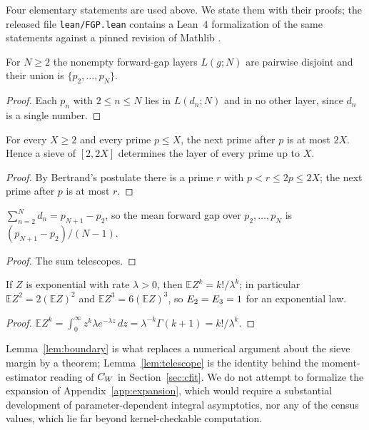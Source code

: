 \documentclass[11pt,a4paper]{article}
\begin{document}
Four elementary statements are used above. We state them with their proofs; the released file \texttt{lean/FGP.lean} contains a Lean~4 formalization of the same statements against a pinned revision of Mathlib \cite{Lean4,mathlib2020}.

\begin{lemma}[Partition]\label{lem:partition}
For $N\ge2$ the nonempty forward-gap layers $L(g;N)$ are pairwise disjoint and their union is $\{p_2,\dots,p_N\}$.
\end{lemma}
\begin{proof}
Each $p_n$ with $2\le n\le N$ lies in $L(d_n;N)$ and in no other layer, since $d_n$ is a single number.
\end{proof}

\begin{lemma}[Boundary]\label{lem:boundary}
For every $X\ge2$ and every prime $p\le X$, the next prime after $p$ is at most $2X$. Hence a sieve of $[2,2X]$ determines the layer of every prime up to $X$.
\end{lemma}
\begin{proof}
By Bertrand's postulate there is a prime $r$ with $p<r\le 2p\le2X$; the next prime after $p$ is at most $r$.
\end{proof}

\begin{lemma}[Telescoping]\label{lem:telescope}
$\sum_{n=2}^{N}d_n=p_{N+1}-p_2$, so the mean forward gap over $p_2,\dots,p_N$ is $(p_{N+1}-p_2)/(N-1)$.
\end{lemma}
\begin{proof}
The sum telescopes.
\end{proof}

\begin{lemma}\label{lem:moments}
If $Z$ is exponential with rate $\lambda>0$, then $\mathbb{E}Z^k=k!/\lambda^k$; in particular $\mathbb{E}Z^2=2(\mathbb{E}Z)^2$ and $\mathbb{E}Z^3=6(\mathbb{E}Z)^3$, so $E_2=E_3=1$ for an exponential law.
\end{lemma}
\begin{proof}
$\mathbb{E}Z^k=\int_0^\infty z^k\lambda e^{-\lambda z}\,dz=\lambda^{-k}\Gamma(k+1)=k!/\lambda^k$.
\end{proof}

Lemma~\ref{lem:boundary} is what replaces a numerical argument about the sieve margin by a theorem; Lemma~\ref{lem:telescope} is the identity behind the moment-estimator reading of $C_W$ in Section~\ref{sec:cfit}. We do not attempt to formalize the expansion of Appendix~\ref{app:expansion}, which would require a substantial development of parameter-dependent integral asymptotics, nor any of the census values, which lie far beyond kernel-checkable computation.


\end{document}
